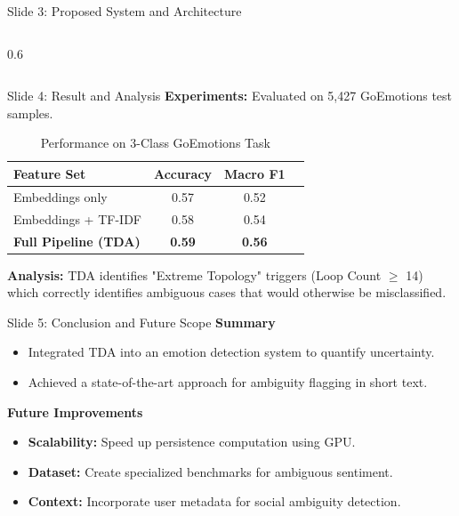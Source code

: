 \documentclass[10pt]{beamer}
\begin{document}
\begin{frame}{Slide 3: Proposed System and Architecture}
\begin{columns}[T]
\begin{column}{0.6\textwidth}
        \end{column}
    \end{columns}
\end{frame}

\begin{frame}{Slide 4: Result and Analysis}
    \textbf{Experiments:} Evaluated on 5,427 GoEmotions test samples.
    \vspace{0.2cm}
    \begin{table}
        \centering
        \small
        \begin{tabular}{lccc}
            \toprule
            \textbf{Feature Set} & \textbf{Accuracy} & \textbf{Macro F1} \\
            \midrule
            Embeddings only        & 0.57 & 0.52 \\
            Embeddings + TF-IDF    & 0.58 & 0.54 \\
            \textbf{Full Pipeline (TDA)} & \textbf{0.59} & \textbf{0.56} \\
            \bottomrule
        \end{tabular}
        \caption{Performance on 3-Class GoEmotions Task}
    \end{table}
    \vspace{0.2cm}
    \textbf{Analysis:} TDA identifies "Extreme Topology" triggers (Loop Count $\geq$ 14) which correctly identifies ambiguous cases that would otherwise be misclassified.
\end{frame}

\begin{frame}{Slide 5: Conclusion and Future Scope}
    \textbf{Summary}
    \begin{itemize}
        \item Integrated TDA into an emotion detection system to quantify uncertainty.
        \item Achieved a state-of-the-art approach for ambiguity flagging in short text.
    \end{itemize}
    \vspace{0.4cm}
    \textbf{Future Improvements}
    \begin{itemize}
        \item \textbf{Scalability:} Speed up persistence computation using GPU.
        \item \textbf{Dataset:} Create specialized benchmarks for ambiguous sentiment.
        \item \textbf{Context:} Incorporate user metadata for social ambiguity detection.
    \end{itemize}
\end{frame}
\end{document}
